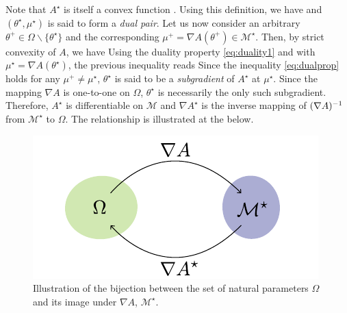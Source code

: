 Note that $A^{\star}$ is itself a convex function \citep[Theorem 12.2]{rockafellar70}. Using this definition, we have
%
%
and $(\theta^{\star},\mu^{\star})$ is said to form a \emph{dual pair}. Let us now consider an arbitrary $\theta^{+}\in\Omega\backslash\{\theta^{\star}\}$ and the corresponding $\mu^{+}=\nabla A(\theta^{+})\in\mathcal M^{\star}$. Then, by strict convexity of $A$, we have
%
%
Using the duality property \eqref{eq:duality1} and with $\mu^{\star}=\nabla A(\theta^{\star})$, the previous inequality reads
%
%
Since the inequality \eqref{eq:dualprop} holds for any $\mu^{+}\neq \mu^{\star}$, $\theta^{\star}$ is said to be a \emph{subgradient} of $A^{\star}$ at $\mu^{\star}$. Since the mapping $\nabla A$ is one-to-one on $\Omega$, $\theta^{\star}$ is necessarily the only such subgradient. Therefore, $A^{\star}$ is differentiable on $\mathcal M$ \citep[theorem 25.1]{rockafellar70} and $\nabla A^{\star}$ is the inverse mapping of $(\nabla A)^{-1}$ from $\mathcal M^{\star}$ to $\Omega$. The relationship is illustrated at the  below.

\begin{figure}[!h]
	\center
	\includegraphics{figures/expf/mapping}
	\caption{\label{bijOmM}Illustration of the bijection between the set of natural parameters $\Omega$ and its image under $\nabla A$, $\mathcal M^{\star}$.}
\end{figure}
%
